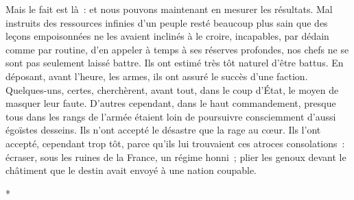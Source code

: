 \documentclass[french,twoside]{book} %
\begin{document}
Mais le fait est là : et nous pouvons maintenant en mesurer les résultats. Mal instruits des ressources infinies d’un peuple resté beaucoup plus sain que des leçons empoisonnées ne les avaient inclinés à le croire, incapables, par dédain comme par routine, d’en appeler à temps à ses réserves profondes, nos chefs ne se sont pas seulement laissé battre. Ils ont estimé très tôt naturel d’être battus. En déposant, avant l’heure, les armes, ils ont assuré le succès d’une faction. Quelques-uns, certes, cherchèrent, avant tout, dans le coup d’État, le moyen de masquer leur faute. D’autres cependant, dans le haut commandement, presque tous dans les rangs de l’armée étaient loin de poursuivre consciemment d’aussi égoïstes desseins. Ils n’ont accepté le désastre que la rage au cœur. Ils l’ont accepté, cependant trop tôt, parce qu’ils lui trouvaient ces atroces consolations : écraser, sous les ruines de la France, un   régime honni ; plier les genoux devant le châtiment que le destin avait envoyé à une nation coupable.\par

\begin{center}
\noindent \centerline{*}\par
\end{center}
\end{document}
